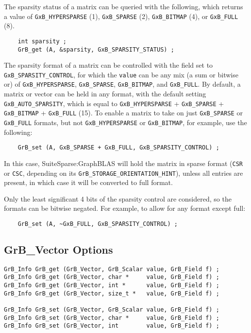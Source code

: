 The sparsity status of a matrix can be queried with the following, which
returns a value of \verb'GxB_HYPERSPARSE' (1), \verb'GxB_SPARSE' (2),
\verb'GxB_BITMAP' (4), or \verb'GxB_FULL' (8).

{\footnotesize
\begin{verbatim}
    int sparsity ;
    GrB_get (A, &sparsity, GxB_SPARSITY_STATUS) ; \end{verbatim}}

The sparsity format of a matrix can be controlled with the field set to
\verb'GxB_SPARSITY_CONTROL', for which the \verb'value' can be any mix (a sum or bitwise
or) of \verb'GxB_HYPERSPARSE', \verb'GxB_SPARSE', \verb'GxB_BITMAP', and
\verb'GxB_FULL'.  By default, a matrix or vector can be held in any format,
with the default setting \verb'GxB_AUTO_SPARSITY', which is equal to
\verb'GxB_HYPERSPARSE' + \verb'GxB_SPARSE' + \verb'GxB_BITMAP' +
\verb'GxB_FULL' (15).  To enable a matrix to take on just \verb'GxB_SPARSE' or
\verb'GxB_FULL' formats, but not \verb'GxB_HYPERSPARSE' or \verb'GxB_BITMAP',
for example, use the following:

{\footnotesize
\begin{verbatim}
    GrB_set (A, GxB_SPARSE + GxB_FULL, GxB_SPARSITY_CONTROL) ; \end{verbatim}}

In this case, SuiteSparse:GraphBLAS will hold the matrix in sparse format
(\verb'CSR' or \verb'CSC', depending on its
\verb'GrB_STORAGE_ORIENTATION_HINT'), unless all entries are present, in which
case it will be converted to full format.

Only the least significant 4 bits of the sparsity control are considered, so
the formats can be bitwise negated.  For example, to allow for any format
except full:

{\footnotesize
\begin{verbatim}
    GrB_set (A, ~GxB_FULL, GxB_SPARSITY_CONTROL) ; \end{verbatim}}

\newpage
\subsection{{\sf GrB\_Vector} Options}
\label{get_set_vector}

\begin{mdframed}[userdefinedwidth=6in]
{\footnotesize
\begin{verbatim}
GrB_Info GrB_get (GrB_Vector, GrB_Scalar value, GrB_Field f) ;
GrB_Info GrB_get (GrB_Vector, char *     value, GrB_Field f) ;
GrB_Info GrB_get (GrB_Vector, int *      value, GrB_Field f) ;
GrB_Info GrB_get (GrB_Vector, size_t *   value, GrB_Field f) ;

GrB_Info GrB_set (GrB_Vector, GrB_Scalar value, GrB_Field f) ;
GrB_Info GrB_set (GrB_Vector, char *     value, GrB_Field f) ;
GrB_Info GrB_set (GrB_Vector, int        value, GrB_Field f) ;
\end{verbatim}
}\end{mdframed}


